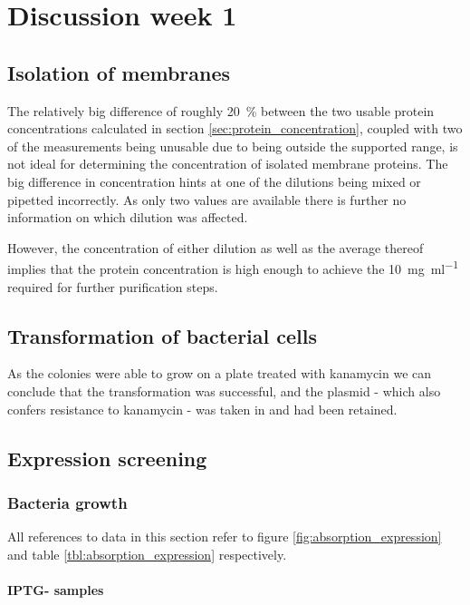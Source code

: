 \chapter{Discussion week 1}

\section{Isolation of membranes}

The relatively big difference of roughly \SI{20}{\percent} between the two
usable protein concentrations calculated in section
\ref{sec:protein_concentration}, coupled with two of the measurements being
unusable due to being outside the supported range, is not ideal for determining
the concentration of isolated membrane proteins. The big difference in
concentration hints at one of the dilutions being mixed or pipetted
incorrectly. As only two values are available there is further no information
on which dilution was affected.

However, the concentration of either dilution as well as the average thereof
implies that the protein concentration is high enough to achieve the
\SI{10}{\mg\per\ml} required for further purification steps.

\section{Transformation of bacterial cells}

As the colonies were able to grow on a plate treated with kanamycin we can
conclude that the transformation was successful, and the plasmid - which also
confers resistance to kanamycin - was taken in and had been retained.

\section{Expression screening}

\subsection{Bacteria growth}

All references to data in this section refer to figure
\ref{fig:absorption_expression} and table \ref{tbl:absorption_expression}
respectively.

\subsubsection{IPTG- samples}

